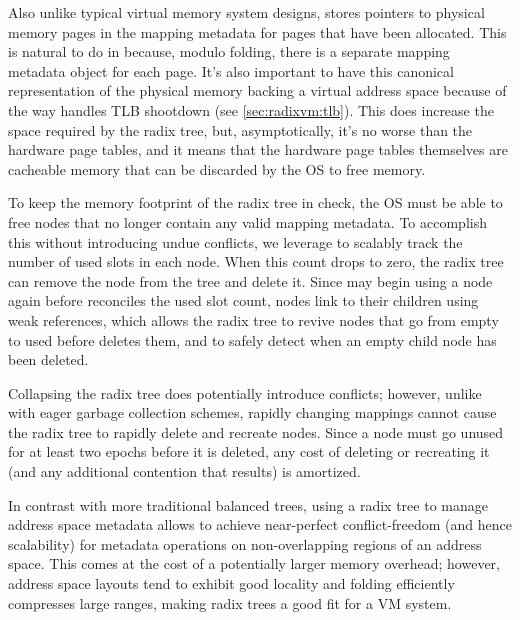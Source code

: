 Also unlike typical virtual memory system designs, \vm stores pointers
to physical memory pages in the mapping metadata for pages that have
been allocated.  This is natural to do in \vm because, modulo folding,
there is a separate mapping metadata object for each page.  It's also
important to have this canonical representation of the physical memory
backing a virtual address space because of the way \vm handles TLB
shootdown (see \cref{sec:radixvm:tlb}).  This does increase the space
required by the radix tree, but, asymptotically, it's no worse than
the hardware page tables, and it means that the hardware page tables
themselves are cacheable memory that can be discarded by the OS to
free memory.

To keep the memory footprint of the radix tree in check, the OS must be
able to free nodes that no longer contain any valid mapping metadata.
To accomplish this without introducing undue conflicts, we leverage
 to scalably track the number of used slots in each node.
When this count drops to zero, the radix tree can remove the node from
the tree and delete it.  Since \vm may begin using a node again before
 reconciles the used slot count, nodes link to their children
using weak references, which allows the radix tree to revive nodes
that go from empty to used before  deletes them, and to
safely detect when an empty child node has been deleted.

Collapsing the radix tree does potentially introduce conflicts;
however, unlike with eager garbage collection schemes, rapidly
changing
mappings cannot cause the radix tree to rapidly delete and recreate
nodes.  Since a node must go unused for at least two  epochs
before it is deleted, any cost of deleting or recreating it (and any
additional contention that results) is amortized.

In contrast with more traditional balanced trees, using a radix tree
to manage address space metadata allows \vm to achieve near-perfect
conflict-freedom (and hence scalability) for metadata operations on
non-overlapping regions of an address
space.  This comes at the cost of a potentially larger memory
overhead; however, address space layouts tend to exhibit good
locality and folding efficiently compresses large ranges, making radix
trees a good fit for a VM system.

